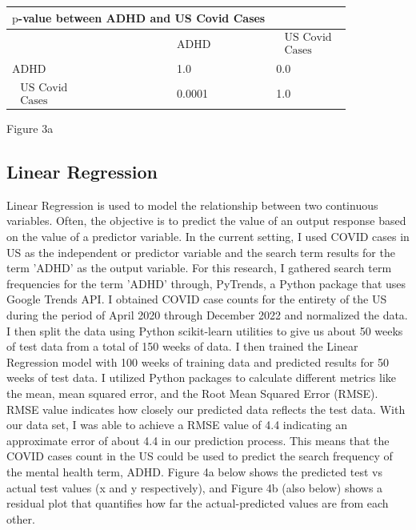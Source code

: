 \documentclass{article}
\begin{document}
\begin{center}
\begin{tabular}{|l|l|l|}
\hline
\multicolumn{2}{|c|}{$\mathrm{p}$-value between ADHD and US Covid Cases} &  \\
\hline
 & ADHD & $\begin{array}{l}\text { US Covid } \\ \text { Cases }\end{array}$ \\
\hline
ADHD & 1.0 & 0.0 \\
\hline
$\begin{array}{l}\text { US Covid } \\ \text { Cases }\end{array}$ & 0.0001 & 1.0 \\
\hline
\end{tabular}
Figure 3a
\end{center}

\subsection{Linear Regression}
Linear Regression is used to model the relationship between two continuous variables. Often, the
objective is to predict the value of an output response based on the value of a predictor variable. In the
current setting, I used COVID cases in US as the independent or predictor variable and the search
term results for the term 'ADHD' as the output variable.
For this research, I gathered search term frequencies for the term 'ADHD' through, PyTrends, a
Python package that uses Google Trends API. I obtained COVID case counts for the entirety of the
US during the period of April 2020 through December 2022 and normalized the data.
I then split the data using Python scikit-learn utilities to give us about 50 weeks of test data from a total
of 150 weeks of data. I then trained the Linear Regression model with 100 weeks of training data and
predicted results for 50 weeks of test data. I utilized Python packages to calculate different metrics like
the mean, mean squared error, and the Root Mean Squared Error (RMSE).
RMSE value indicates how closely our predicted data reflects the test data. With our data set, I was
able to achieve a RMSE value of 4.4 indicating an approximate error of about 4.4 in our prediction
process. This means that the COVID cases count in the US could be used to predict the search
frequency of the mental health term, ADHD. Figure 4a below shows the predicted test vs actual test values (x and y respectively), and Figure 4b (also below) shows a residual plot that quantifies how far the actual-predicted values are from each other.
\end{document}
